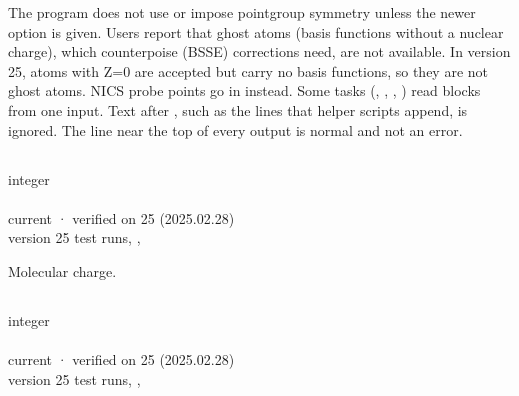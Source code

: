 \documentclass[letterpaper,10pt,english,openany,oneside]{sphinxmanual}
\begin{document}
\sphinxAtStartPar
The program does not use or impose point\sphinxhyphen{}group symmetry unless the newer  option is given. Users report
that ghost atoms (basis functions without a nuclear charge), which counterpoise (BSSE) corrections need, are not
available. In version 25, atoms with Z=0 are accepted but carry no basis functions, so they are not ghost atoms.
NICS probe points go in  instead. Some tasks (, , , ) read   blocks from one input.
Text after , such as the  lines that helper scripts append, is ignored. The line
 near the top of every output is normal and not an error.


\subsection{}
\label{\detokenize{reference/molecule:charge}}\label{\detokenize{reference/molecule:molecule-charge}}
\ignorespaces 
\sphinxAtStartPar
{} integer\\
 \\
 current · verified on 25 (2025.02.28)\\
 version 25 test runs, , 

\sphinxAtStartPar
Molecular charge.


\subsection{}
\label{\detokenize{reference/molecule:mult}}\label{\detokenize{reference/molecule:molecule-mult}}
\ignorespaces 
\sphinxAtStartPar
{} integer\\
 \\
 current · verified on 25 (2025.02.28)\\
 version 25 test runs, , 
\end{document}
